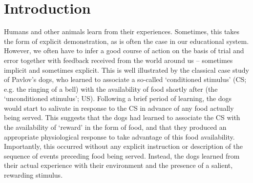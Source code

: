\section{Introduction}
\label{sec:intro}

Humans and other animals learn from their experiences.
Sometimes, this takes the form of explicit demonstration, as is often the case in our educational system.
However, we often have to infer a good course of action on the basis of trial and error together with feedback received from the world around us -- sometimes implicit and sometimes explicit.
This is well illustrated by the classical case study of Pavlov's dogs, who learned to associate a so-called `conditioned stimulus' (CS; e.g. the ringing of a bell) with the availability of food shortly after (the `unconditioned stimulus'; US).
Following a brief period of learning, the dogs would start to salivate in response to the CS in advance of any food actually being served.
This suggests that the dogs had learned to associate the CS with the availability of `reward' in the form of food, and that they produced an appropriate physiological response to take advantage of this food availability.
Importantly, this occurred without any explicit instruction or description of the sequence of events preceding food being served.
Instead, the dogs learned from their actual experience with their environment and the presence of a salient, rewarding stimulus.

